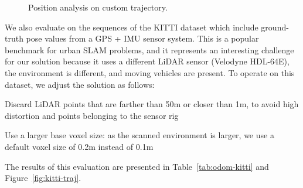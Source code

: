 \begin{figure}[h]
    \centering
    \hspace{1pt}
    \caption[Position analysis on custom trajectory]{Position analysis on custom trajectory. }
    \label{fig:xyz-traj}
\end{figure}

We also evaluate on the sequences of the KITTI dataset \cite{geiger2013vision} which include ground-truth pose values from a GPS + IMU sensor system. This is a popular benchmark for urban SLAM problems, and it represents an interesting challenge for our solution because it uses a different LiDAR sensor (Velodyne HDL-64E), the environment is different, and moving vehicles are present. To operate on this dataset, we adjust the solution as follows:
\begin{compactitem}
    \item Discard LiDAR points that are farther than 50m or closer than 1m, to avoid high distortion and points belonging to the sensor rig
    \item Use a larger base voxel size: as the scanned environment is larger, we use a default voxel size of 0.2m instead of 0.1m
\end{compactitem}
The results of this evaluation are presented in Table~\ref{tab:odom-kitti} and Figure~\ref{fig:kitti-traj}.

